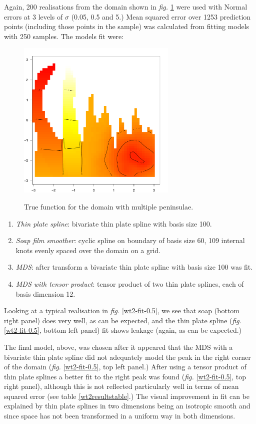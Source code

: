 \documentclass[a4paper,10pt]{article}
\newcommand{\fig}[1]{\emph{fig.} \ref{#1}}
\begin{document}
Again, 200 realisations from the domain shown in \fig{wt2-truth} were used with Normal errors at 3 levels of $\sigma$ (0.05, 0.5 and 5.) Mean squared error over 1253 prediction points (including those points in the sample) was calculated from fitting models with 250 samples. The models fit were:

\begin{figure}
\centering
\includegraphics[width=3in]{figs/wt2-truth.pdf} \\
\caption{True function for the domain with multiple peninsulae.}
\label{wt2-truth}
\end{figure}

\begin{enumerate}
\item \emph{Thin plate spline}: bivariate thin plate spline with basis size 100. 
\item \emph{Soap film smoother}: cyclic spline on boundary of basis size 60, 109 internal knots evenly spaced over the domain on a grid.
\item \emph{MDS}: after transform a bivariate thin plate spline with basis size 100 was fit. 
\item \emph{MDS with tensor product}: tensor product of two thin plate splines, each of basis dimension 12.
\end{enumerate} 

Looking at a typical realisation in \fig{wt2-fit-0.5}, we see that soap (bottom right panel) does very well, as can be expected, and the thin plate spline (\fig{wt2-fit-0.5}, bottom left panel) fit shows leakage (again, as can be expected.) 

The final model, above, was chosen after it appeared that the MDS with a bivariate thin plate spline did not adequately model the peak in the right corner of the domain (\fig{wt2-fit-0.5}, top left panel.) After using a tensor product of thin plate splines a better fit to the right peak was found (\fig{wt2-fit-0.5}, top right panel), although this is not reflected particularly well in terms of mean squared error (see table \ref{wt2resultstable}.) The visual improvement in fit can be explained by thin plate splines in two dimensions being an isotropic smooth and since space has not been transformed in a uniform way in both dimensions.
\end{document}
